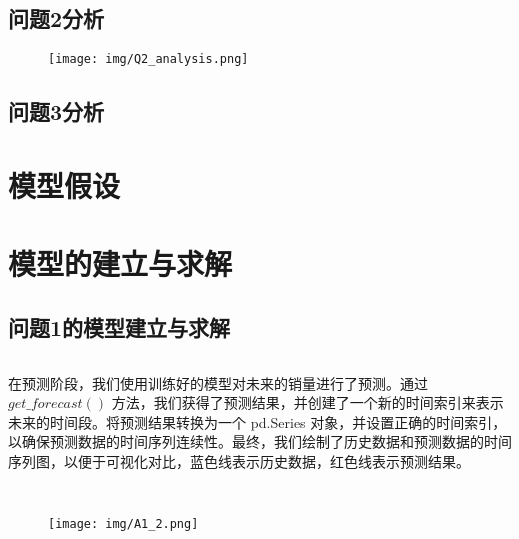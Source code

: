 \documentclass[a4paper]{article}
\begin{document}
		\subsection{问题2分析}
		\begin{figure}[H]
		\centering
		\texttt{[image: img/Q2\_analysis.png]}
	\end{figure}
	\subsection{问题3分析}
	

	\section{模型假设}
	
	\begin{enumerate}


	\end{enumerate}

	\section{模型的建立与求解}  
	\subsection{问题1的模型建立与求解}


	\begin{lstlisting}[caption={Python}, label={lst:example}]

	\end{lstlisting}

	在预测阶段，我们使用训练好的模型对未来的销量进行了预测。通过 $get\_forecast()$ 方法，我们获得了预测结果，并创建了一个新的时间索引来表示未来的时间段。将预测结果转换为一个 pd.Series 对象，并设置正确的时间索引，以确保预测数据的时间序列连续性。最终，我们绘制了历史数据和预测数据的时间序列图，以便于可视化对比，蓝色线表示历史数据，红色线表示预测结果。
	\begin{lstlisting}[caption={Python}, label={lst:example}]


	\end{lstlisting}


	\begin{figure}[H]
		\centering
		\texttt{[image: img/A1\_2.png]}
	\end{figure}
\end{document}
